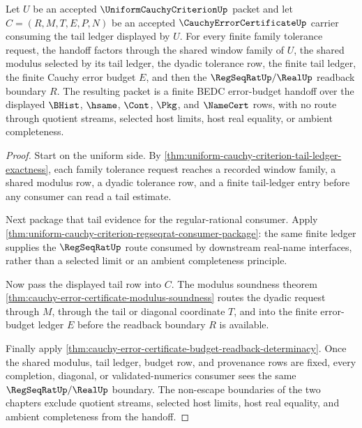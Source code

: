 \begin{theorem}
\label{thm:cauchy-error-certificate-uniform-budget-handoff}
Let $U$ be an accepted $\UniformCauchyCriterionUp$ packet and let $C=(R,M,T,E,P,N)$ be an accepted $\CauchyErrorCertificateUp$ carrier consuming the tail ledger displayed by $U$. For every finite family tolerance request, the handoff factors through the shared window family of $U$, the shared modulus selected by its tail ledger, the dyadic tolerance row, the finite tail ledger, the finite Cauchy error budget $E$, and then the $\RegSeqRatUp/\RealUp$ readback boundary $R$. The resulting packet is a finite BEDC error-budget handoff over the displayed $\BHist$, $\hsame$, $\Cont$, $\Pkg$, and $\NameCert$ rows, with no route through quotient streams, selected host limits, host real equality, or ambient completeness.
\end{theorem}
\begin{proof}
Start on the uniform side. By \autoref{thm:uniform-cauchy-criterion-tail-ledger-exactness}, each family tolerance request reaches a recorded window family, a shared modulus row, a dyadic tolerance row, and a finite tail-ledger entry before any consumer can read a tail estimate.

Next package that tail evidence for the regular-rational consumer. Apply \autoref{thm:uniform-cauchy-criterion-regseqrat-consumer-package}: the same finite ledger supplies the $\RegSeqRatUp$ route consumed by downstream real-name interfaces, rather than a selected limit or an ambient completeness principle.

Now pass the displayed tail row into $C$. The modulus soundness theorem \autoref{thm:cauchy-error-certificate-modulus-soundness} routes the dyadic request through $M$, through the tail or diagonal coordinate $T$, and into the finite error-budget ledger $E$ before the readback boundary $R$ is available.

Finally apply \autoref{thm:cauchy-error-certificate-budget-readback-determinacy}. Once the shared modulus, tail ledger, budget row, and provenance rows are fixed, every completion, diagonal, or validated-numerics consumer sees the same $\RegSeqRatUp/\RealUp$ boundary. The non-escape boundaries of the two chapters exclude quotient streams, selected host limits, host real equality, and ambient completeness from the handoff.
\end{proof}

